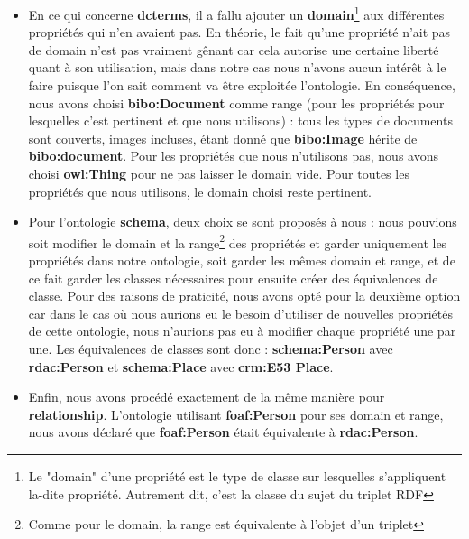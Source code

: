 \begin{itemize}
    \item[\ding{103}] En ce qui concerne \textbf{dcterms}, il a fallu ajouter un \textbf{domain}\footnote{Le "domain" d'une propriété est le type de classe sur lesquelles s'appliquent la-dite propriété. Autrement dit, c'est la classe du sujet du triplet RDF} aux différentes propriétés qui n'en avaient pas. En théorie, le fait qu'une propriété n'ait pas de domain n'est pas vraiment gênant car cela autorise une certaine liberté quant à son utilisation, mais dans notre cas nous n'avons aucun intérêt à le faire puisque l'on sait comment va être exploitée l'ontologie. En conséquence, nous avons choisi \textbf{bibo:Document} comme range (pour les propriétés pour lesquelles c'est pertinent et que nous utilisons) : tous les types de documents sont couverts, images incluses, étant donné que \textbf{bibo:Image} hérite de \textbf{bibo:document}. Pour les propriétés que nous n'utilisons pas, nous avons choisi \textbf{owl:Thing} pour ne pas laisser le domain vide. Pour toutes les propriétés que nous utilisons, le domain choisi reste pertinent.
    \item[\ding{103}] Pour l'ontologie \textbf{schema}, deux choix se sont proposés à nous : nous pouvions soit modifier le domain et la range\footnote{Comme pour le domain, la range est équivalente à l'objet d'un triplet} des propriétés et garder uniquement les propriétés dans notre ontologie, soit garder les mêmes domain et range, et de ce fait garder les classes nécessaires pour ensuite créer des équivalences de classe. Pour des raisons de praticité, nous avons opté pour la deuxième option car dans le cas où nous aurions eu le besoin d'utiliser de nouvelles propriétés de cette ontologie, nous n'aurions pas eu à modifier chaque propriété une par une. Les équivalences de classes sont donc : \textbf{schema:Person} avec \textbf{rdac:Person} et \textbf{schema:Place} avec \textbf{crm:E53 Place}.
    \item[\ding{103}] Enfin, nous avons procédé exactement de la même manière pour \textbf{relationship}. L'ontologie utilisant \textbf{foaf:Person} pour ses domain et range, nous avons déclaré que \textbf{foaf:Person} était équivalente à \textbf{rdac:Person}.
\end{itemize}

